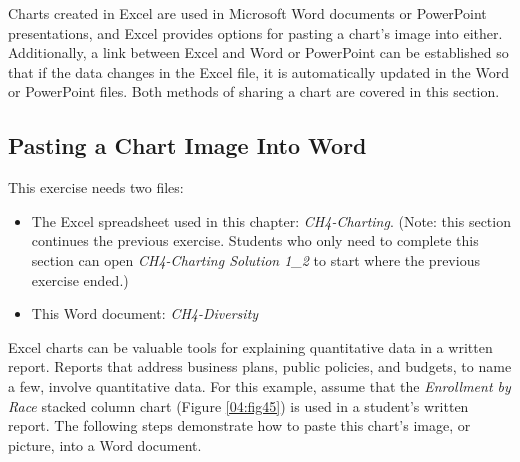 Charts created in Excel are used in Microsoft Word documents or PowerPoint presentations, and Excel provides options for pasting a chart's image into either. Additionally, a link between Excel and Word or PowerPoint can be established so that if the data changes in the Excel file, it is automatically updated in the Word or PowerPoint files. Both methods of sharing a chart are covered in this section.

\subsection{Pasting a Chart Image Into Word}

This exercise needs two files:

\begin{itemize}
	\item The Excel spreadsheet used in this chapter: \textit{CH4-Charting}. (Note: this section continues the previous exercise. Students who only need to complete this section can open \textit{CH4-Charting Solution 1\_2} to start where the previous exercise ended.)
	\item This Word document: \textit{CH4-Diversity}
\end{itemize}

Excel charts can be valuable tools for explaining quantitative data in a written report. Reports that address business plans, public policies, and budgets, to name a few, involve quantitative data. For this example, assume that the \textit{Enrollment by Race} stacked column chart (Figure \ref{04:fig45}) is used in a student's written report. The following steps demonstrate how to paste this chart's image, or picture, into a Word document.

